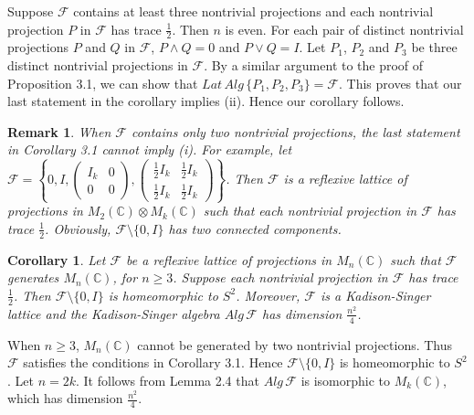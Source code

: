 \documentclass[12pt]{article}
\newtheorem{corollary}{Corollary}[section]
\newtheorem{remark}{Remark}[section]
\newcommand{\FFF}{\mathcal F}
\newcommand{\C}{\mathbb C} %
\begin{document}
{Suppose $\FFF$ contains at least three nontrivial projections and
each nontrivial projection $P$ in $\FFF$ has trace $\frac 12$. Then
$n$ is even. For each pair of distinct nontrivial projections $P$
and $Q$ in $\FFF$, $P\wedge Q=0$ and $P\vee Q=I$. Let $P_1$, $P_2$
and $P_3$ be three distinct nontrivial projections in $\FFF$. By a
similar argument to the proof of Proposition 3.1, we can show that
$Lat\,Alg\,\{P_1, P_2, P_3\} = \FFF$. This proves that our last
statement in the corollary implies (ii). Hence our corollary
follows.

\begin{remark} When $\FFF$ contains only two nontrivial projections, the last statement in Corollary 3.1 cannot imply (i). For example, let
$\FFF=\left\{0,I, \left(\begin{array}{cc} I_k & 0\\
0&0\end{array}\right), \left(\begin{array}{cc} \frac12 I_k & \frac12 I_k\\
\frac12 I_k&\frac12 I_k\end{array}\right)\right\}$. Then $\FFF$ is a
reflexive lattice of projections in $M_2(\C)\otimes M_k(\C)$ such
that each nontrivial projection in $\FFF$ has  trace $\frac 12$.
Obviously, $\FFF \setminus \{0, I \}$ has two connected components.
\end{remark}

\begin{corollary} Let $\FFF$ be a reflexive lattice of projections in $M_n(\C)$ such that $\FFF$ generates $M_n(\C)$, for $n\geq 3$.
Suppose each nontrivial projection in $\FFF$ has trace $\frac 12$.
Then $\FFF\setminus\{0,I\}$ is homeomorphic to $S^2$. Moreover,
$\FFF$ is a Kadison-Singer lattice and the Kadison-Singer algebra
$Alg\,\FFF$ has dimension $\frac{n^2}{4}$.
\end{corollary}

\quad When $n\geq 3$, $M_n(\C)$ cannot be
generated by two nontrivial projections. Thus $\FFF$ satisfies the
conditions in Corollary 3.1. Hence $\FFF\setminus\{0,I\}$ is
homeomorphic to $S^2$. Let $n=2k$. It follows from Lemma 2.4 that
$Alg\,\FFF$ is isomorphic to $M_k(\C)$, which has dimension
$\frac{n^2}{4}$.

}
\end{document}
